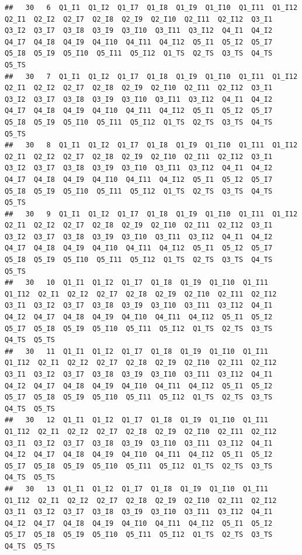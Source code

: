 \documentclass[
]{book}
\begin{document}
\begin{verbatim}
##   30   6  Q1_I1  Q1_I2  Q1_I7  Q1_I8  Q1_I9  Q1_I10  Q1_I11  Q1_I12  Q2_I1  Q2_I2  Q2_I7  Q2_I8  Q2_I9  Q2_I10  Q2_I11  Q2_I12  Q3_I1  Q3_I2  Q3_I7  Q3_I8  Q3_I9  Q3_I10  Q3_I11  Q3_I12  Q4_I1  Q4_I2  Q4_I7  Q4_I8  Q4_I9  Q4_I10  Q4_I11  Q4_I12  Q5_I1  Q5_I2  Q5_I7  Q5_I8  Q5_I9  Q5_I10  Q5_I11  Q5_I12  Q1_TS  Q2_TS  Q3_TS  Q4_TS  Q5_TS
##   30   7  Q1_I1  Q1_I2  Q1_I7  Q1_I8  Q1_I9  Q1_I10  Q1_I11  Q1_I12  Q2_I1  Q2_I2  Q2_I7  Q2_I8  Q2_I9  Q2_I10  Q2_I11  Q2_I12  Q3_I1  Q3_I2  Q3_I7  Q3_I8  Q3_I9  Q3_I10  Q3_I11  Q3_I12  Q4_I1  Q4_I2  Q4_I7  Q4_I8  Q4_I9  Q4_I10  Q4_I11  Q4_I12  Q5_I1  Q5_I2  Q5_I7  Q5_I8  Q5_I9  Q5_I10  Q5_I11  Q5_I12  Q1_TS  Q2_TS  Q3_TS  Q4_TS  Q5_TS
##   30   8  Q1_I1  Q1_I2  Q1_I7  Q1_I8  Q1_I9  Q1_I10  Q1_I11  Q1_I12  Q2_I1  Q2_I2  Q2_I7  Q2_I8  Q2_I9  Q2_I10  Q2_I11  Q2_I12  Q3_I1  Q3_I2  Q3_I7  Q3_I8  Q3_I9  Q3_I10  Q3_I11  Q3_I12  Q4_I1  Q4_I2  Q4_I7  Q4_I8  Q4_I9  Q4_I10  Q4_I11  Q4_I12  Q5_I1  Q5_I2  Q5_I7  Q5_I8  Q5_I9  Q5_I10  Q5_I11  Q5_I12  Q1_TS  Q2_TS  Q3_TS  Q4_TS  Q5_TS
##   30   9  Q1_I1  Q1_I2  Q1_I7  Q1_I8  Q1_I9  Q1_I10  Q1_I11  Q1_I12  Q2_I1  Q2_I2  Q2_I7  Q2_I8  Q2_I9  Q2_I10  Q2_I11  Q2_I12  Q3_I1  Q3_I2  Q3_I7  Q3_I8  Q3_I9  Q3_I10  Q3_I11  Q3_I12  Q4_I1  Q4_I2  Q4_I7  Q4_I8  Q4_I9  Q4_I10  Q4_I11  Q4_I12  Q5_I1  Q5_I2  Q5_I7  Q5_I8  Q5_I9  Q5_I10  Q5_I11  Q5_I12  Q1_TS  Q2_TS  Q3_TS  Q4_TS  Q5_TS
##   30   10  Q1_I1  Q1_I2  Q1_I7  Q1_I8  Q1_I9  Q1_I10  Q1_I11  Q1_I12  Q2_I1  Q2_I2  Q2_I7  Q2_I8  Q2_I9  Q2_I10  Q2_I11  Q2_I12  Q3_I1  Q3_I2  Q3_I7  Q3_I8  Q3_I9  Q3_I10  Q3_I11  Q3_I12  Q4_I1  Q4_I2  Q4_I7  Q4_I8  Q4_I9  Q4_I10  Q4_I11  Q4_I12  Q5_I1  Q5_I2  Q5_I7  Q5_I8  Q5_I9  Q5_I10  Q5_I11  Q5_I12  Q1_TS  Q2_TS  Q3_TS  Q4_TS  Q5_TS
##   30   11  Q1_I1  Q1_I2  Q1_I7  Q1_I8  Q1_I9  Q1_I10  Q1_I11  Q1_I12  Q2_I1  Q2_I2  Q2_I7  Q2_I8  Q2_I9  Q2_I10  Q2_I11  Q2_I12  Q3_I1  Q3_I2  Q3_I7  Q3_I8  Q3_I9  Q3_I10  Q3_I11  Q3_I12  Q4_I1  Q4_I2  Q4_I7  Q4_I8  Q4_I9  Q4_I10  Q4_I11  Q4_I12  Q5_I1  Q5_I2  Q5_I7  Q5_I8  Q5_I9  Q5_I10  Q5_I11  Q5_I12  Q1_TS  Q2_TS  Q3_TS  Q4_TS  Q5_TS
##   30   12  Q1_I1  Q1_I2  Q1_I7  Q1_I8  Q1_I9  Q1_I10  Q1_I11  Q1_I12  Q2_I1  Q2_I2  Q2_I7  Q2_I8  Q2_I9  Q2_I10  Q2_I11  Q2_I12  Q3_I1  Q3_I2  Q3_I7  Q3_I8  Q3_I9  Q3_I10  Q3_I11  Q3_I12  Q4_I1  Q4_I2  Q4_I7  Q4_I8  Q4_I9  Q4_I10  Q4_I11  Q4_I12  Q5_I1  Q5_I2  Q5_I7  Q5_I8  Q5_I9  Q5_I10  Q5_I11  Q5_I12  Q1_TS  Q2_TS  Q3_TS  Q4_TS  Q5_TS
##   30   13  Q1_I1  Q1_I2  Q1_I7  Q1_I8  Q1_I9  Q1_I10  Q1_I11  Q1_I12  Q2_I1  Q2_I2  Q2_I7  Q2_I8  Q2_I9  Q2_I10  Q2_I11  Q2_I12  Q3_I1  Q3_I2  Q3_I7  Q3_I8  Q3_I9  Q3_I10  Q3_I11  Q3_I12  Q4_I1  Q4_I2  Q4_I7  Q4_I8  Q4_I9  Q4_I10  Q4_I11  Q4_I12  Q5_I1  Q5_I2  Q5_I7  Q5_I8  Q5_I9  Q5_I10  Q5_I11  Q5_I12  Q1_TS  Q2_TS  Q3_TS  Q4_TS  Q5_TS

\end{verbatim}
\end{document}
